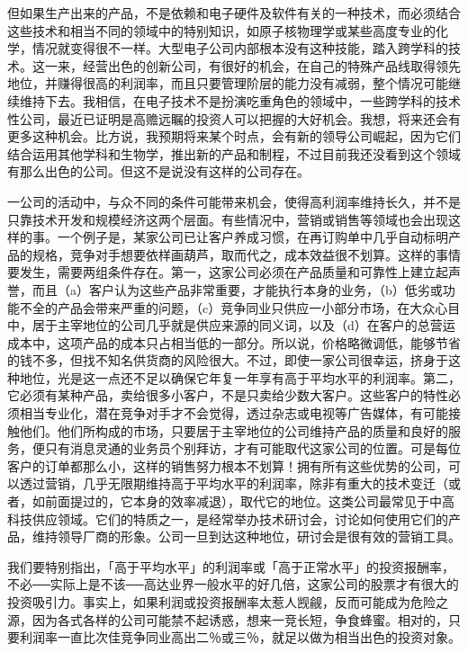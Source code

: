 \documentclass[UTF8,a4paper,zihao=-4,fontset = windows]{ctexart} %
\begin{document}
但如果生产出来的产品，不是依赖和电子硬件及软件有关的一种技术，而必须结合这些技术和相当不同的领域中的特别知识，如原子核物理学或某些高度专业的化学，情况就变得很不一样。大型电子公司内部根本没有这种技能，踏入跨学科的技术。这一来，经营出色的创新公司，有很好的机会，在自己的特殊产品线取得领先地位，并赚得很高的利润率，而且只要管理阶层的能力没有减弱，整个情况可能继续维持下去。我相信，在电子技术不是扮演吃重角色的领域中，一些跨学科的技术性公司，最近已证明是高赡远瞩的投资人可以把握的大好机会。我想，将来还会有更多这种机会。比方说，我预期将来某个时点，会有新的领导公司崛起，因为它们结合运用其他学科和生物学，推出新的产品和制程，不过目前我还没看到这个领域有那么出色的公司。但这不是说没有这样的公司存在。

一公司的活动中，与众不同的条件可能带来机会，使得高利润率维持长久，并不是只靠技术开发和规模经济这两个层面。有些情况中，营销或销售等领域也会出现这样的事。一个例子是，某家公司已让客户养成习惯，在再订购单中几乎自动标明产品的规格，竞争对手想要依样画葫芦，取而代之，成本效益很不划算。这样的事情要发生，需要两组条件存在。第一，这家公司必须在产品质量和可靠性上建立起声誉，而且（a）客户认为这些产品非常重要，才能执行本身的业务，（b）低劣或功能不全的产品会带来严重的问题，（c）竞争同业只供应一小部分市场，在大众心目中，居于主宰地位的公司几乎就是供应来源的同义词，以及（d）在客户的总营运成本中，这项产品的成本只占相当低的一部分。所以说，价格略微调低，能够节省的钱不多，但找不知名供货商的风险很大。不过，即使一家公司很幸运，挤身于这种地位，光是这一点还不足以确保它年复一年享有高于平均水平的利润率。第二，它必须有某种产品，卖给很多小客户，不是只卖给少数大客户。这些客户的特性必须相当专业化，潜在竞争对手才不会觉得，透过杂志或电视等广告媒体，有可能接触他们。他们所构成的市场，只要居于主宰地位的公司维持产品的质量和良好的服务，便只有消息灵通的业务员个别拜访，才有可能取代这家公司的位置。可是每位客户的订单都那么小，这样的销售努力根本不划算！拥有所有这些优势的公司，可以透过营销，几乎无限期维持高于平均水平的利润率，除非有重大的技术变迁（或者，如前面提过的，它本身的效率减退），取代它的地位。这类公司最常见于中高科技供应领域。它们的特质之一，是经常举办技术研讨会，讨论如何使用它们的产品，维持领导厂商的形象。公司一旦到达这种地位，研讨会是很有效的营销工具。

我们要特别指出，「高于平均水平」的利润率或「高于正常水平」的投资报酬率，不必──实际上是不该──高达业界一般水平的好几倍，这家公司的股票才有很大的投资吸引力。事实上，如果利润或投资报酬率太惹人觊觎，反而可能成为危险之源，因为各式各样的公司可能禁不起诱惑，想来一竞长短，争食蜂蜜。相对的，只要利润率一直比次佳竞争同业高出二％或三％，就足以做为相当出色的投资对象。
\end{document}
